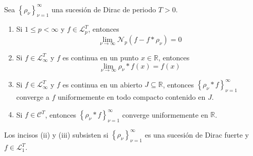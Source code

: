 \documentclass[12pt]{report}
\theoremstyle{largebreak}
\newcommand{\N}[2]{\ensuremath{\mathcal{N}_{#1}\left(#2\right)}}
\begin{document}
    \begin{theor}
        Sea $\left\{\rho_\nu \right\}_{\nu=1}^\infty$ una sucesión de Dirac de periodo $T>0$.
        \begin{enumerate}
            \item  Si $1\leq p<\infty$ y $f\in\mathcal{L}_p^T$, entonces
            \begin{equation*}
                \lim_{\nu\rightarrow\infty}\N{p}{f-f*\rho_\nu}=0
            \end{equation*}
            \item Si $f\in\mathcal{L}_\infty^T$ y $f$ es continua en un punto $x\in\mathbb{R}$, entonces
            \begin{equation*}
                \lim_{\nu\rightarrow\infty}\rho_\nu*f(x)=f(x)
            \end{equation*}
            \item Si $f\in\mathcal{L}_\infty^T$ y $f$ es continua en un abierto $J\subseteq\mathbb{R}$, entonces $\left\{\rho_\nu*f\right\}_{\nu=1}^\infty$ converge a $f$ uniformemente en todo compacto contenido en $J$.
            \item Si $f\in\mathcal{C}^T$, entonces $\left\{\rho_\nu*f\right\}_{\nu=1}^\infty$ converge uniformemente en $\mathbb{R}$.
        \end{enumerate}
        Los incisos (ii) y (iii) subsisten si $\left\{ \rho_\nu\right\}_{\nu=1}^\infty$ es una sucesión de Dirac fuerte y $f\in\mathcal{L}_1^T$.
    \end{theor}
\end{document}
